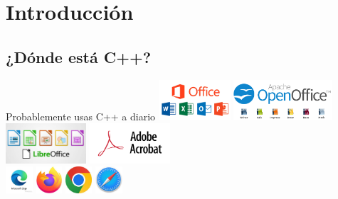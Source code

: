 \section{Introducción}

\subsection{¿Dónde está C++?}

\begin{frame}[t]{Probablemente usas C++ a diario}
\centering
\includegraphics[height=1.5cm]{logos/office.png}
\hspace{1cm}
\includegraphics[height=1.5cm]{logos/open-office.png}
\\
\vspace{.5cm}
\includegraphics[height=1.5cm]{logos/libre-office.jpg}
\hspace{2cm}
\includegraphics[height=1.5cm]{logos/adobe.png}
\\
\vspace{.5cm}
\includegraphics[height=1cm]{logos/edge.jpg}
\hspace{1cm}
\includegraphics[height=1cm]{logos/firefox.jpg}
\hspace{1cm}
\includegraphics[height=1cm]{logos/chrome.jpg}
\hspace{1cm}
\includegraphics[height=1cm]{logos/safari.jpg}

\end{frame}

